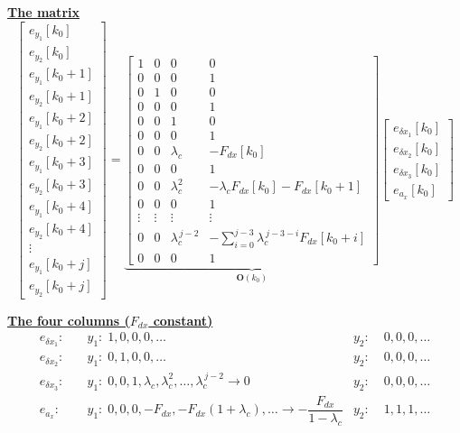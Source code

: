 \documentclass[11pt,a4paper]{ctexart}
\newcommand{\lc}{\lambda_c}
\newcommand{\hd}[1]{\par\bigskip\noindent\underline{\textbf{#1}}}
\begin{document}
\hd{The matrix}
\[
\begin{bmatrix} e_{y_1}[k_0] \\ e_{y_2}[k_0] \\[0.3ex] e_{y_1}[k_0+1] \\ e_{y_2}[k_0+1] \\[0.3ex] e_{y_1}[k_0+2] \\ e_{y_2}[k_0+2] \\[0.3ex] e_{y_1}[k_0+3] \\ e_{y_2}[k_0+3] \\[0.3ex] e_{y_1}[k_0+4] \\ e_{y_2}[k_0+4] \\ \vdots \\ e_{y_1}[k_0+j] \\ e_{y_2}[k_0+j] \end{bmatrix}
=
\underbrace{\begin{bmatrix}
1 & 0 & 0 & 0 \\
0 & 0 & 0 & 1 \\[0.3ex]
0 & 1 & 0 & 0 \\
0 & 0 & 0 & 1 \\[0.3ex]
0 & 0 & 1 & 0 \\
0 & 0 & 0 & 1 \\[0.3ex]
0 & 0 & \lc & -F_{dx}[k_0] \\
0 & 0 & 0 & 1 \\[0.3ex]
0 & 0 & \lc^2 & -\lc F_{dx}[k_0] - F_{dx}[k_0+1] \\
0 & 0 & 0 & 1 \\
\vdots & \vdots & \vdots & \vdots \\
0 & 0 & \lc^{\,j-2} & -\sum_{i=0}^{j-3}\lc^{\,j-3-i}F_{dx}[k_0+i] \\
0 & 0 & 0 & 1
\end{bmatrix}}_{\mathbf{O}(k_0)}
\begin{bmatrix} e_{\delta x_1}[k_0] \\ e_{\delta x_2}[k_0] \\ e_{\delta x_3}[k_0] \\ e_{a_x}[k_0] \end{bmatrix}
\]

\hd{The four columns ($F_{dx}$ constant)}
\[
\begin{aligned}
e_{\delta x_1}:&\quad y_1:\; 1, 0, 0, 0, \dots & y_2:&\; 0, 0, 0, \dots \\
e_{\delta x_2}:&\quad y_1:\; 0, 1, 0, 0, \dots & y_2:&\; 0, 0, 0, \dots \\
e_{\delta x_3}:&\quad y_1:\; 0, 0, 1, \lc, \lc^2, \dots, \lc^{\,j-2} \to 0 & y_2:&\; 0, 0, 0, \dots \\
e_{a_x}:&\quad y_1:\; 0, 0, 0, -F_{dx}, -F_{dx}(1+\lc), \dots \to -\dfrac{F_{dx}}{1-\lc} & y_2:&\; 1, 1, 1, \dots
\end{aligned}
\]
\end{document}
